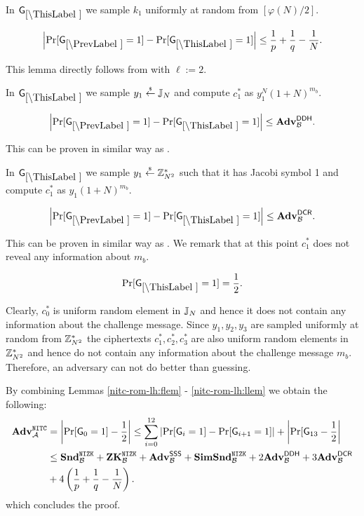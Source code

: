 In $\games_\thisgame$ we sample $k_1$ uniformly at random from $[\varphi(N)/2]$. 

\begin{lemma}
\[
\left|\Pr[\games_\prevgame = 1] - \Pr[\games_\thisgame = 1]\right| \leq \frac{1}{p}+\frac{1}{q}-\frac{1}{N}.
\]
\end{lemma}

This lemma directly follows from  with $\ell:=2$.

In $\games_\thisgame$ we sample $y_1 \stackrel{{\scriptscriptstyle\$}}{\leftarrow} \mathbb{J}_N$ and compute $c_1^*$ as  $y_1^{N} (1+N)^{m_b}$. 

\begin{lemma}
\[
\left|\Pr[\games_\prevgame = 1] - \Pr[\games_\thisgame = 1]\right| \leq \advtg_\advB^\ddh.
\]
\end{lemma}
This can be proven in similar way as .

In $\games_\thisgame$ we sample $y_1 \stackrel{{\scriptscriptstyle\$}}{\leftarrow} \mathbb{Z}_{N^2}^*$ such that it has Jacobi symbol 1 and compute $c_1^*$ as $y_1(1+N)^{m_b}$. 

\begin{lemma}
\[
\left|\Pr[\games_\prevgame = 1] - \Pr[\games_\thisgame = 1]\right| \leq \advtg_\advB^\dcr.
\]
\end{lemma}
This can be proven in similar way as . We remark that at this point $c_1^*$ does not reveal any information about $m_b$.

\begin{lemma}\label{nitc-rom-lh:llem}
\[
\Pr[\games_\thisgame = 1] = \half.
\]
\end{lemma}

Clearly, $c_0^*$ is uniform random element in $\mathbb{J}_N$ and hence it does not contain any information about the challenge message. Since $y_1, y_2, y_3$ are sampled uniformly at random from $\mathbb{Z}_{N^2}^*$ the ciphertexts $c_1^*, c_2^*, c_3^*$ are also uniform random elements in $\mathbb{Z}_{N^2}^*$ and hence do not contain any information about the challenge message $m_b$. Therefore, an adversary can not do better than guessing.

By combining Lemmas \ref{nitc-rom-lh:flem} - \ref{nitc-rom-lh:llem} we obtain the following:
\begin{align*}
\mathbf{Adv}^{\mathtt{NITC}}_{\mathcal{A}} &= \left| \Pr[\mathsf{G}_0 = 1] - \frac{1}{2} \right| \leq \sum_{i=0}^{12} \left|\Pr[\mathsf{G}_i = 1] - \Pr[\mathsf{G}_{i+1} = 1] \right| + \left|\Pr[\mathsf{G}_{13}- \frac{1}{2}\right| \\
 &\leq  \mathbf{Snd}^{\mathtt{NIZK}}_{\mathcal{B}} + \mathbf{ZK}^{\mathtt{NIZK}}_{\mathcal{B}} + \mathbf{Adv}^{\mathsf{SSS}}_{\mathcal{B}} + \mathbf{SimSnd}^{\mathtt{NIZK}}_{\mathcal{B}} + 2 \mathbf{Adv}^{\mathsf{DDH}}_{\mathcal{B}} + 3 \mathbf{Adv}^{\mathsf{DCR}}_{\mathcal{B}} \\ &+ 4 \left( \frac{1}{p}+\frac{1}{q}-\frac{1}{N} \right).
\end{align*}
which concludes the proof.


